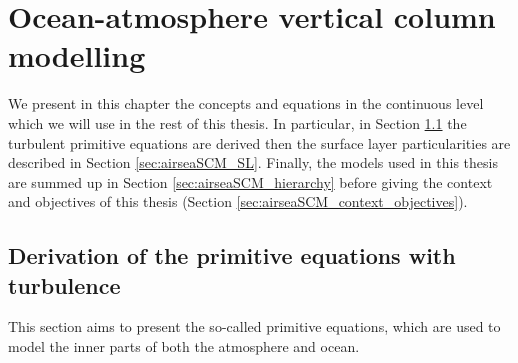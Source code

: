 \chapter{Ocean-atmosphere vertical column modelling}
\label{ch:airseaSCM}
\minitoc
We present in this chapter the concepts and equations in
the continuous level which
we will use in the rest of this thesis.
In particular, in Section \ref{sec:airseaSCM_primitiveEquations}
the turbulent primitive equations are derived then
the surface layer particularities are described in Section
\ref{sec:airseaSCM_SL}.
Finally, the models used in this thesis are summed up
in Section \ref{sec:airseaSCM_hierarchy}
before giving the context and objectives of this thesis
(Section \ref{sec:airseaSCM_context_objectives}).
\section{Derivation of the primitive equations with turbulence}
\label{sec:airseaSCM_primitiveEquations}
This section aims to present the so-called
primitive equations, which are used to model
the inner parts of both the atmosphere and ocean.

